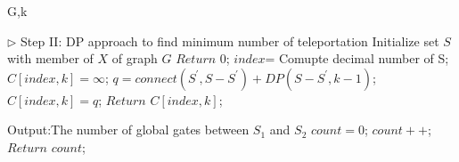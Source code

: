 
\begin{algorithm}
{
\fontsize{9}{1}
\caption{Dynamic programming to find the minimum number of communication}
\begin{algorithmic}[3]

 {G,k}    

\State\textcolor[rgb]{0.00,0.50,1.00}{ $\triangleright$ Step II: DP approach to find minimum number of  teleportation}
\State Initialize set $S$ with member of $X$ of graph $G$
\State $Return$  0;
\EndIf
\State $index$= Comupte decimal number of S; 
\State $ C[index,k]=\infty$;
    \State $q=connect(S^{'},S-S^{'})+DP(S-S^{'},k-1)$;
       \State $C[index,k]=q$;
   \EndIf
\EndFor 
\State $Return$  $C[index,k]$;    
\EndFunction






\State \textcolor[rgb]{0.00,0.50,1.00}{ Output:The number of global gates between $S_{1}$  and $S_{2}$}
\State $count=0$;
     \State $count++$;
\EndIf
\EndFor
\EndFor
\EndFor
\State $Return$ $count$;
\EndFunction


\end{algorithmic}
}
\end{algorithm}